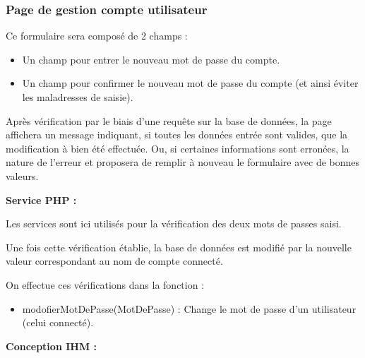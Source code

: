 		\subsubsection{Page de gestion compte utilisateur}

			\begin{paragraphe}
				Ce formulaire sera composé de 2 champs :
				\begin{itemize}
					\item Un champ pour entrer le nouveau mot de passe du compte.
					\item Un champ pour confirmer le nouveau mot de passe du compte (et ainsi éviter les maladresses de saisie).
				\end{itemize}
			\end{paragraphe}

			\begin{paragraphe}
				Après vérification par le biais d'une requête sur la base de données, la page affichera un message indiquant, si toutes les données entrée sont valides, que la modification à bien été effectuée. Ou, si certaines informations sont erronées, la nature de l'erreur et proposera de remplir à nouveau le formulaire avec de bonnes valeurs.
			\end{paragraphe}

			\begin{paragraphe}
				\textbf{Service PHP :}
			\end{paragraphe}

			\begin{paragraphe}
				Les services sont ici utilisés pour la vérification des deux mots de passes saisi.\par
				Une fois cette vérification établie, la base de données est modifié par la nouvelle valeur correspondant au nom de compte connecté. 
			\end{paragraphe}

			\begin{paragraphe}
				On effectue ces vérifications dans la fonction :
				\begin{itemize}
					\item modofierMotDePasse(MotDePasse) : Change le mot de passe d'un utilisateur (celui connecté).
				\end{itemize}
			\end{paragraphe}

			\begin{paragraphe}
				\textbf{Conception IHM :}
			\end{paragraphe}

